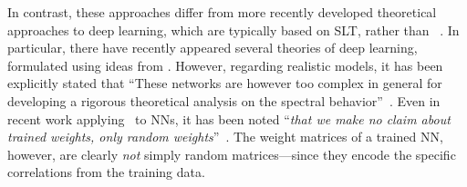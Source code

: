 In contrast, these \SemiEmpirical approaches differ from more
recently developed theoretical approaches to deep learning, which are typically based on SLT, rather than \STATMECH~\cite{Roberts2021}.
In particular, there have recently appeared several theories of deep learning, formulated using ideas from \RMT.
However, regarding realistic models, it has been explicitly stated that
``These networks are however too complex in general for developing a rigorous theoretical analysis on the spectral behavior''~\cite{LBNx17_TR}.
Even in recent work applying \RMT~to NNs, it has been noted
``\emph{that we make no claim about trained weights, only random weights}''~\cite{Yang2021}.
The weight matrices of a trained NN, however, are clearly \emph{not} simply random matrices---since they encode the specific correlations from the training data.
